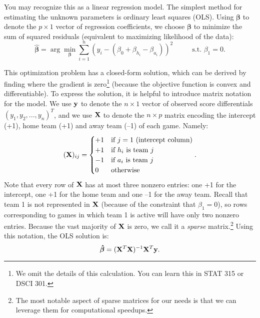 \documentclass{article}
\begin{document}
  You may recognize this as a linear regression model. The simplest method for estimating the unknown parameters is ordinary least squares (OLS). Using $\boldsymbol{\beta}$ to denote the $p \times 1$ vector of regression coefficients, we choose $\boldsymbol{\beta}$ to minimize the sum of squared residuals (equivalent to maximizing likelihood of the data):
  \begin{equation}
    \label{eqn-least-squares}
    \boldsymbol{\hat\beta} = \arg\min_{\boldsymbol{\beta}} \sum_{i=1}^n (y_i - (\beta_0 + \beta_{h_i} - \beta_{a_i}))^2 \hspace{1cm} \mbox{ s.t. } \beta_1 = 0.
  \end{equation}

  This optimization problem has a closed-form solution, which can be derived by finding where the gradient is zero\footnote{We omit the details of this calculation. You can learn this in STAT 315 or DSCI 301.} (because the objective function is convex and differentiable). To express the solution, it is helpful to introduce matrix notation for the model. We use $\bf y$ to denote the $n \times 1$ vector of observed score differentials $(y_1, y_2, ..., y_n)^T$, and we use $\bf X$ to denote the $n \times p$ matrix encoding the intercept (+1), home team (+1) and away team (--1) of each game. Namely:
  \begin{equation*}
    ({\bf X})_{ij} = \begin{cases}
      +1 & \mbox{if $j = 1$ (intercept column)}\\
      +1 & \mbox{if $h_i$ is team $j$}\\
      -1 & \mbox{if $a_i$ is team $j$}\\
      0 & \mbox{otherwise}
    \end{cases}.
  \end{equation*}
  Note that every row of $\bf X$ has at most three nonzero entries: one +1 for the intercept, one +1 for the home team and one --1 for the away team. Recall that team 1 is not represented in $\bf X$ (because of the constraint that $\beta_1 = 0$), so rows corresponding to games in which team 1 is active will have only two nonzero entries. Because the vast majority of $\bf X$ is zero, we call it a {\it sparse} matrix.\footnote{The most notable aspect of sparse matrices for our needs is that we can leverage them for computational speedups.} Using this notation, the OLS solution is:
  \begin{equation*}
    \boldsymbol{\hat\beta} = ({\bf X}^T {\bf X})^{-1} {\bf X}^T {\bf y}.
  \end{equation*}
\end{document}
